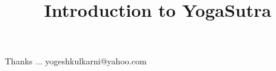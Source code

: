 \documentclass[xcolor=dvipsnames,compress,t,pdf,9pt]{beamer}
\title[\insertframenumber /\inserttotalframenumber]{Introduction to YogaSutra}
\begin{document}
	\begin{frame}
	\titlepage
	\end{frame}
	
	
	
	\begin{frame}[c]{}
	Thanks ...
	\vspace{5mm}
	yogeshkulkarni@yahoo.com
	\end{frame}
\end{document}
